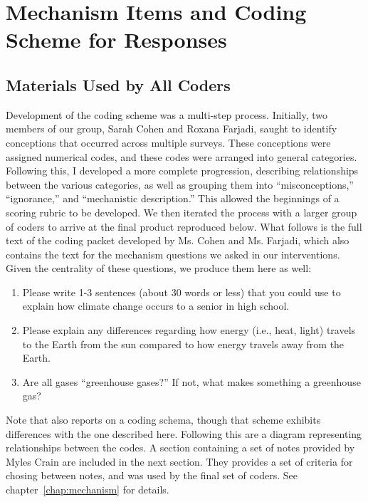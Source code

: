 \chapter{Mechanism Items and Coding Scheme for Responses}
\label{app:coding}

\section{Materials Used by All Coders}
\label{sec:materials}

Development of the coding scheme was a multi-step process. Initially, two
members of our group, Sarah Cohen and Roxana Farjadi, saught to identify
conceptions that occurred across multiple surveys. These conceptions were
assigned numerical codes, and these codes were arranged into general categories.
Following this, I developed a more complete progression, describing
relationships between the various categories, as well as grouping them into
“misconceptions,” “ignorance,” and “mechanistic description.” This allowed the
beginnings of a scoring rubric to be developed. We then iterated the process
with a larger group of coders to arrive at the final product reproduced below.
What follows is the full text of the coding packet developed by Ms. Cohen and
Ms. Farjadi, which also contains the text for the mechanism questions we
asked in our interventions. Given the centrality of these questions, we produce
them here as well:
\begin{enumerate}
    \item Please write 1-3 sentences (about 30 words or less) that you could use
        to explain how climate change occurs to a senior in high school.
    \item Please explain any differences regarding how energy (i.e., heat,
        light) travels to the Earth from the sun compared to how energy travels
        away from the Earth.
    \item Are all gases “greenhouse gases?” If not, what makes something a
        greenhouse gas?
\end{enumerate}

Note that \textcite{cohen_san_2012_f} also reports on a coding schema, though
that scheme exhibits differences with the one described here. Following this are
a diagram representing relationships between the codes. A section containing a
set of notes provided by Myles Crain are included in the next section. They
provides a set of criteria for chosing between notes, and was used by the final
set of coders. See chapter~\ref{chap:mechanism} for details.

